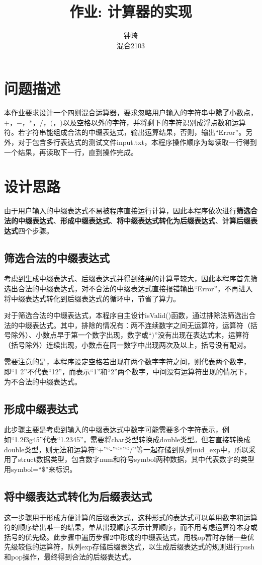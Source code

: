 \documentclass{ctexart}
\title{作业: 计算器的实现}
\author{钟琦 \\ 混合2103\quad3210103612}
\begin{document}
\maketitle
\section{问题描述}
本作业要求设计一个四则混合运算器，要求忽略用户输入的字符串中\textbf{除了}小数点，$+$，$-$，$*$，$/$，$($，$)$以及空格以外的字符，并将剩下的字符识别成浮点数和运算符。若字符串能组成合法的中缀表达式，输出运算结果，否则，输出“Error”。另外，对于包含多行表达式的测试文件input.txt，本程序操作顺序为每读取一行得到一个结果，再读取下一行，直到操作完成。
\section{设计思路}
由于用户输入的中缀表达式不易被程序直接运行计算，因此本程序依次进行\textbf{筛选合法的中缀表达式}、\textbf{形成中缀表达式}、\textbf{将中缀表达式转化为后缀表达式}、\textbf{计算后缀表达式}四个步骤。
\subsection{筛选合法的中缀表达式}
考虑到生成中缀表达式、后缀表达式并得到结果的计算量较大，因此本程序首先筛选出合法的中缀表达式，对不合法的中缀表达式直接报错输出“Error”，不再进入将中缀表达式转化到后缀表达式的循环中，节省了算力。\par
对于筛选合法的中缀表达式，本程序自主设计isValid()函数，通过排除法筛选出合法的中缀表达式。其中，排除的情况有：两不连续数字之间无运算符，运算符（括号除外）、小数点早于第一个数字出现，数字或“$)$”没有出现在表达式末，运算符（括号除外）连续出现，小数点在同一数字中出现两次及以上，括号没有配对。\par
需要注意的是，本程序设定空格若出现在两个数字字符之间，则代表两个数字，即“1 2”不代表“12”，而表示“1”和“2”两个数字，中间没有运算符出现的情况下，为不合法的中缀表达式。\par
\subsection{形成中缀表达式}
此步骤主要是考虑到输入的中缀表达式中数字可能需要多个字符表示，例如“1.2f3g45”代表“1.2345”，需要将char类型转换成double类型。但若直接转换成double类型，则无法和运算符“+”“-”“*”“/”等一起存储到队列mid\_exp中，所以采用了struct数据类型，包含数字num和符号symbol两种数据，其中代表数字的类型用symbol=“\$”来标识。
\subsection{将中缀表达式转化为后缀表达式}
这一步骤用于形成方便计算的后缀表达式，这种形式的表达式可以单用数字和运算符的顺序给出唯一的结果，单从出现顺序表示计算顺序，而不用考虑运算符本身或括号的优先级。此步骤中遍历步骤2中形成的中缀表达式，用栈op暂时存储一些优先级较低的运算符，队列exp存储后缀表达式，以生成后缀表达式的规则进行push和pop操作，最终得到合法的后缀表达式。
\end{document}
